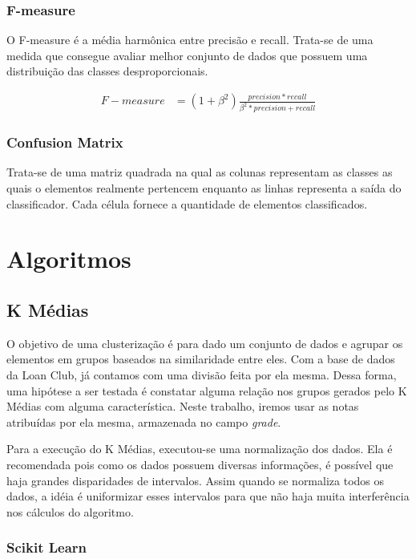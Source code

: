\subsubsection{F-measure}
O F-measure é a média harmônica entre precisão e recall. Trata-se de uma medida que consegue avaliar melhor conjunto de dados que possuem uma distribuição das classes desproporcionais. 

\begin{equation}
  \label{eq:precision}
  \begin{aligned}
F-measure &= (1 + \beta^{2})\frac{precision*recall}{\beta^{2}*precision + recall} 
  \end{aligned}  
\end{equation}

\subsubsection{Confusion Matrix}
Trata-se de uma matriz quadrada na qual 
as colunas representam as classes as quais o elementos realmente pertencem enquanto as linhas representa a saída do classificador. Cada célula fornece a quantidade de elementos classificados.

\section{Algoritmos}

\subsection{K Médias}

O objetivo de uma clusterização é para dado um conjunto de dados e agrupar os elementos em grupos baseados na similaridade entre eles. Com a base de dados da Loan Club, já contamos com uma divisão feita por ela mesma. Dessa forma, uma hipótese a ser testada é constatar alguma relação nos grupos gerados pelo K Médias com alguma característica. Neste trabalho, iremos usar as notas atribuídas por ela mesma, armazenada no campo \emph{grade}.

Para a execução do K Médias, executou-se uma normalização dos dados. Ela é recomendada pois como os dados possuem diversas informações, é possível que haja grandes disparidades de intervalos. Assim quando se normaliza todos os dados, a idéia é uniformizar esses intervalos para que não haja muita interferência nos cálculos do algoritmo. 

\subsubsection{Scikit Learn}

